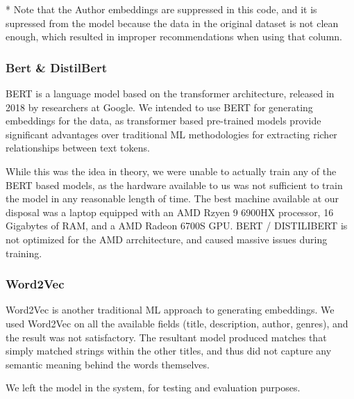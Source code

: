 * Note that the Author embeddings are suppressed in this code, and it is supressed from the model because the data in the original dataset is not clean enough, which resulted in improper recommendations when using that column.

\subsubsection*{Bert \& DistilBert}
BERT is a language model based on the transformer architecture, released in 2018 by researchers at Google. We intended to use BERT for generating embeddings for the data, as transformer based pre-trained models provide significant advantages over traditional ML methodologies for extracting richer relationships between text tokens.

While this was the idea in theory, we were unable to actually train any of the BERT based models, as the hardware available to us was not sufficient to train the model in any reasonable length of time. The best machine available at our disposal was a laptop equipped with an AMD Rzyen 9 6900HX processor, 16 Gigabytes of RAM, and a AMD Radeon 6700S GPU. BERT / DISTILIBERT is not optimized for the AMD arrchitecture, and caused massive issues during training.

\subsubsection*{Word2Vec}
Word2Vec is another traditional ML approach to generating embeddings. We used Word2Vec on all the available fields (title, description, author, genres), and the result was not satisfactory. The resultant model produced matches that simply matched strings within the other titles, and thus did not capture any semantic meaning behind the words themselves.

We left the model in the system, for testing and evaluation purposes.